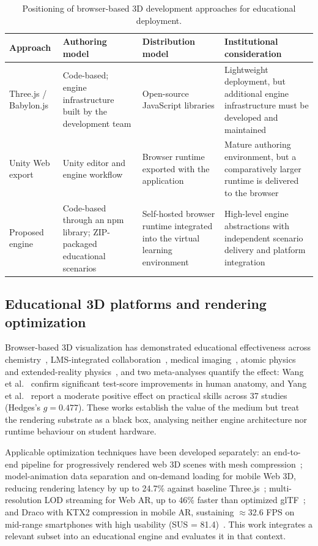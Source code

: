 \begin{table}[H]
\centering
\small
\setlength{\tabcolsep}{4pt}
\caption{Positioning of browser-based 3D development approaches for educational deployment.}
\label{tab:gap-analysis}
\begin{tabularx}{\textwidth}{@{}>{\raggedright\arraybackslash}p{2.2cm} >{\raggedright\arraybackslash}X >{\raggedright\arraybackslash}X >{\raggedright\arraybackslash}X@{}}
\toprule
Approach & Authoring model & Distribution model & Institutional consideration \\
\midrule
Three.js / Babylon.js & Code-based; engine infrastructure built by the development team & Open-source JavaScript libraries & Lightweight deployment, but additional engine infrastructure must be developed and maintained \\
Unity Web export & Unity editor and engine workflow & Browser runtime exported with the application & Mature authoring environment, but a comparatively larger runtime is delivered to the browser \\
Proposed engine & Code-based through an npm library; ZIP-packaged educational scenarios & Self-hosted browser runtime integrated into the virtual learning environment & High-level engine abstractions with independent scenario delivery and platform integration \\
\bottomrule
\end{tabularx}
\end{table}

\subsection{Educational 3D platforms and rendering optimization}

Browser-based 3D visualization has demonstrated educational effectiveness across chemistry~\cite{Rodrguez2021}, LMS-integrated collaboration~\cite{Hensen2023}, medical imaging~\cite{Li2021}, atomic physics~\cite{Kraitem2025} and extended-reality physics~\cite{ZatarainCabada2022}, and two meta-analyses quantify the effect: Wang et al.~\cite{Wang2024} confirm significant test-score improvements in human anatomy, and Yang et al.~\cite{Yang2024} report a moderate positive effect on practical skills across 37 studies (Hedges's $g = 0.477$). These works establish the value of the medium but treat the rendering substrate as a black box, analysing neither engine architecture nor runtime behaviour on student hardware.

Applicable optimization techniques have been developed separately: an end-to-end pipeline for progressively rendered web 3D scenes with mesh compression~\cite{Evans2017}; model-animation data separation and on-demand loading for mobile Web 3D, reducing rendering latency by up to 24.7\% against baseline Three.js~\cite{Li2020}; multi-resolution LOD streaming for Web AR, up to 46\% faster than optimized glTF~\cite{Boutsi2023}; and Draco with KTX2 compression in mobile AR, sustaining $\approx$32.6 FPS on mid-range smartphones with high usability (SUS = 81.4)~\cite{Suwandi2026}. This work integrates a relevant subset into an educational engine and evaluates it in that context.
